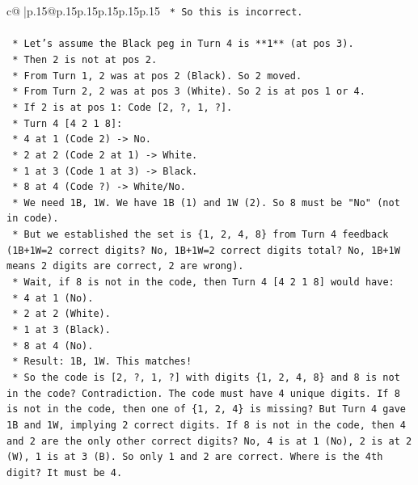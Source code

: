 \documentclass{article}
\begin{document}
{\begin{supertabular}{c@{$\;$}|p{.15\linewidth}@{}p{.15\linewidth}p{.15\linewidth}p{.15\linewidth}p{.15\linewidth}p{.15\linewidth}}
{{{\texttt{                            *   So this is incorrect.} \\
\\ 
\texttt{                    *   Let's assume the Black peg in Turn 4 is **1** (at pos 3).} \\
\texttt{                        *   Then 2 is not at pos 2.} \\
\texttt{                        *   From Turn 1, 2 was at pos 2 (Black). So 2 moved.} \\
\texttt{                        *   From Turn 2, 2 was at pos 3 (White). So 2 is at pos 1 or 4.} \\
\texttt{                        *   If 2 is at pos 1: Code {[}2, ?, 1, ?{]}.} \\
\texttt{                            *   Turn 4 {[}4 2 1 8{]}:} \\
\texttt{                                *   4 at 1 (Code 2) {-}> No.} \\
\texttt{                                *   2 at 2 (Code 2 at 1) {-}> White.} \\
\texttt{                                *   1 at 3 (Code 1 at 3) {-}> Black.} \\
\texttt{                                *   8 at 4 (Code ?) {-}> White/No.} \\
\texttt{                                *   We need 1B, 1W. We have 1B (1) and 1W (2). So 8 must be "No" (not in code).} \\
\texttt{                                *   But we established the set is \{1, 2, 4, 8\} from Turn 4 feedback (1B+1W=2 correct digits? No, 1B+1W=2 correct digits total? No, 1B+1W means 2 digits are correct, 2 are wrong).} \\
\texttt{                                *   Wait, if 8 is not in the code, then Turn 4 {[}4 2 1 8{]} would have:} \\
\texttt{                                    *   4 at 1 (No).} \\
\texttt{                                    *   2 at 2 (White).} \\
\texttt{                                    *   1 at 3 (Black).} \\
\texttt{                                    *   8 at 4 (No).} \\
\texttt{                                    *   Result: 1B, 1W. This matches!} \\
\texttt{                                *   So the code is {[}2, ?, 1, ?{]} with digits \{1, 2, 4, 8\} and 8 is not in the code? Contradiction. The code must have 4 unique digits. If 8 is not in the code, then one of \{1, 2, 4\} is missing? But Turn 4 gave 1B and 1W, implying 2 correct digits. If 8 is not in the code, then 4 and 2 are the only other correct digits? No, 4 is at 1 (No), 2 is at 2 (W), 1 is at 3 (B). So only 1 and 2 are correct. Where is the 4th digit? It must be 4.} \\
}}}
\end{supertabular}}
\end{document}
